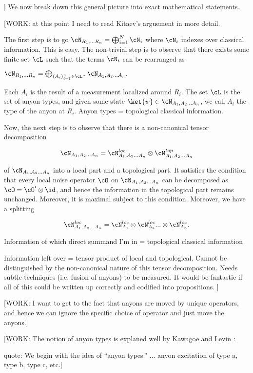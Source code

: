 ]
We now break down this general picture into exact mathematical statements.

[WORK: at this point I need to read Kitaev's arguement in more detail.

The first step is to go $\cN_{R_1,... R_n}=\bigoplus_{i=1}^{N}\cN_{i}$ where $\cN_i$ indexes over classical information. This is easy. The non-trivial step is to observe that there exists some finite set $\cL$ such that the terms $\cN_i$ can be rearranged as 

$\cN_{R_1,... R_n}=\bigoplus_{(A_i)_{i=1}^n\in \cL^n}\cN_{A_1,A_2... A_n}.$

Each $A_i$ is the result of a measurement localized around $R_i$. The set $\cL$ is the set of anyon types, and given some state $\ket{\psi}\in \cN_{A_1,A_2... A_n}$, we call $A_i$ the type of the anyon at $R_i$. Anyon types = topological classical information.

Now, the next step is to observe that there is a non-canonical tensor decomposition


$$
\cN_{A_1,A_2... A_n}=\cN^{loc}_{A_1,A_2... A_n}\otimes \cN^{top}_{A_1,A_2... A_n}
$$

of $\cN_{A_1,A_2... A_n}$ into a local part and a topological part. It satisfies the condition that every local noise operator $\cO$ on $\cN_{A_1,A_2... A_n}$ can be decomposed as $\cO=\cO'\otimes \id$, and hence the information in the topological part remains unchanged. Moreover, it is maximal subject to this condition. Moreover, we have a splitting

$$\cN^{loc}_{A_1,A_2... A_n}=\cN^{loc}_{A_1}\otimes \cN^{loc}_{A_2}...\otimes \cN^{loc}_{A_n}.$$


Information of which direct summand I'm in = topological classical information

Information left over = tensor product of local and topological. Cannot be distinguished by the non-canonical nature of this tensor decomposition. Needs subtle techniques (i.e. fusion of anyons) to be measured. It would be fantastic if all of this could be written up correctly and codified into propositions.
]


[WORK: I want to get to the fact that anyons are moved by unique operators, and hence we can ignore the specific choice of operator and just move the anyons.]

[WORK: The notion of anyon types is explaned well by Kawagoe and Levin \cite{kawagoe2020microscopic}:

quote: We begin with the idea of “anyon types.” ... anyon excitation of type a, type b,
type c, etc.]

